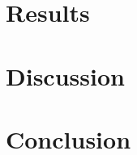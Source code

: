 \documentclass[11pt]{article}
\begin{document}
\section{Results}
\label{sec:results}


\section{Discussion}
\label{sec:discussion}


\section{Conclusion}
\label{sec:conclusion}




\end{document}
